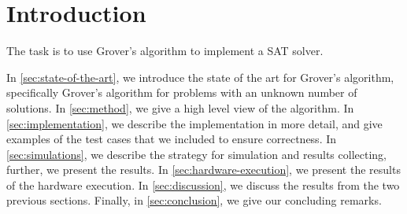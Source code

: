 \section{Introduction}

The task is to use Grover's algorithm to implement a SAT solver.

In \autoref{sec:state-of-the-art}, we introduce the state of the art for Grover's algorithm, specifically Grover's algorithm for problems with an unknown number of solutions.
In \autoref{sec:method}, we give a high level view of the algorithm.
In \autoref{sec:implementation}, we describe the implementation in more detail, and give examples of the test cases that we included to ensure correctness.
In \autoref{sec:simulations}, we describe the strategy for simulation and results collecting, further, we present the results.
In \autoref{sec:hardware-execution}, we present the results of the hardware execution.
In \autoref{sec:discussion}, we discuss the results from the two previous sections.
Finally, in \autoref{sec:conclusion}, we give our concluding remarks.

